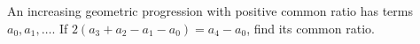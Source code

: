 An increasing geometric progression with positive common ratio has terms $ a_0,a_1,\ldots $. If $ 2(a_3+a_2-a_1-a_0)=a_4-a_0 $, find its common ratio.
